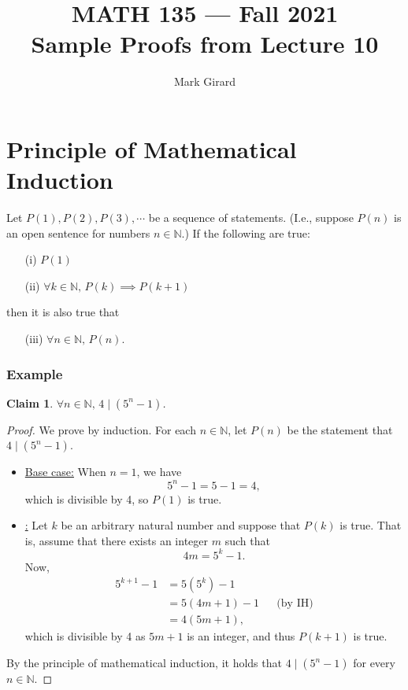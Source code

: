 \documentclass[11pt]{article}
\theoremstyle{plain}
\newtheorem*{claim}{Claim}
\theoremstyle{plain}
\theoremstyle{remark}
\def\naturals{\mathbb{N}}
\begin{document}
\title{MATH 135 --- Fall 2021\\ Sample Proofs from Lecture 10}
\author{Mark Girard}

\maketitle

\section*{Principle of Mathematical Induction}
Let $P(1),P(2),P(3),\cdots$ be a sequence of statements. (I.e., suppose $P(n)$ is an open sentence for numbers $n\in\naturals$.) If the following are true:
\begin{itemize}
\item[(i)] $P(1)$
\item[(ii)] $\forall k\in\naturals,\, P(k)\implies P(k+1)$
\end{itemize}
then it is also true that
\begin{itemize}
 \item[(iii)]$\forall n\in\naturals,\, P(n)$.
\end{itemize}




\subsubsection*{Example}

\begin{tcolorbox}
\begin{claim}
$ \forall n\in\naturals,\, 4\mid (5^n-1)$.
\end{claim}
\end{tcolorbox}

\begin{proof}
 We prove by induction. For each $n\in\naturals$,  let  $P(n)$ be the statement that $4\mid (5^n-1)$. 
 \begin{itemize}
  \item\underline{Base case:} When $n=1$, we have
  \[
   5^n-1 = 5- 1 = 4,
  \]
which is divisible by 4, so $P(1)$ is true.
\item\underline{:} Let $k$ be an arbitrary natural number and suppose that $P(k)$ is true. That is, assume that there exists an integer $m$ such that 
\[
 4m = 5^k-1. \tag{IH}
\]
Now, 
\begin{align*}
 5^{k+1}-1 &= 5(5^k)-1 \\
           &= 5(4m+1) - 1 && \text{(by IH)}\\
           &= 4(5m+1),
\end{align*}
which is divisible by 4 as $5m+1$ is an integer, and thus $P(k+1)$ is true.
 \end{itemize}
By the principle of mathematical induction, it holds that $4\mid (5^n-1)$ for every $n\in\naturals$.
\end{proof}
\end{document}
